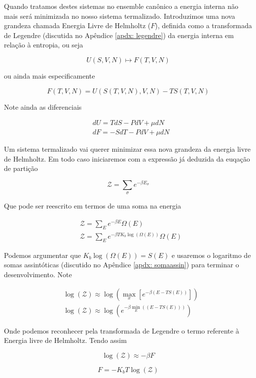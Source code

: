Quando tratamos destes sistemas no ensemble canônico a energia interna não mais será minimizada no nosso sistema termalizado. Introduzimos uma nova grandeza chamada Energia Livre de Helmholtz ($F$), definida como a transformada de Legendre (discutida no Apêndice \ref{apdx: legendre}) da energia interna em relação à entropia, ou seja

\begin{equation}
	 U(S,V,N) \mapsto F(T, V, N)
\end{equation}

ou ainda mais especificamente

\[
	F(T, V, N) = U(S(T,V,N), V, N) - T S(T,V,N) 
\]

Note ainda as diferenciais

\begin{align*}
	& dU = TdS - PdV + \mu dN \\
	& dF = -SdT - PdV + \mu dN
\end{align*}

Um sistema termalizado vai querer minimizar essa nova grandeza da energia livre de Helmholtz. Em todo caso iniciaremos com a expressão já deduzida da euqação de partição

\[
	\mathcal{Z} = \sum_{\sigma} e^{-\beta E_\sigma}
\]

Que pode ser reescrito em termos de uma soma na energia

\begin{align*}
	& \mathcal{Z} = \sum_{E} e^{-\beta E} \Omega(E) \\
	& \mathcal{Z} = \sum_{E} e^{-\beta T K_b \log{(\Omega(E))}} \Omega(E)
\end{align*}

Podemos argumentar que $ K_b \log{(\Omega(E))} = S(E)$ e usaremos o logaritmo de somas assintóticas (discutido no Apêndice \ref{apdx: somaassin}) para terminar o desenvolvimento. Note

\begin{align*}
	& \log{(\mathcal{Z})} \approx \log{\left( \max_x{[e^{-\beta(E - T S(E))}]} \right)} \\
	& \log{(\mathcal{Z})} \approx \log{\left(e^{-\beta \min_E{((E - T S(E)))}} \right)}
\end{align*}

Onde podemos reconhecer pela transformada de Legendre o termo referente à Energia livre de Helmholtz. Tendo assim

\[
	\log{(\mathcal{Z})} \approx -\beta F
\]	

\begin{equation}
	F = - K_b T \log{(\mathcal{Z})}
\end{equation}
